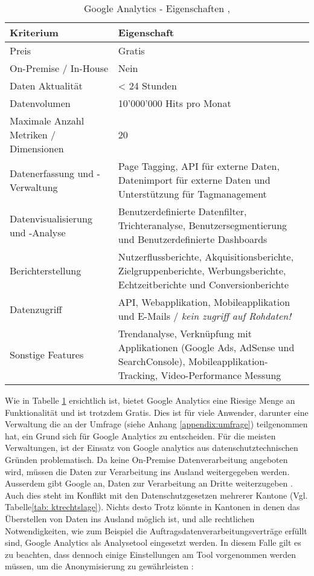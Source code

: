 \begin{table}[h]
	\centering
	\begin{tabular}{ | p{4cm} | p{10cm} |}
		\hline
		\textbf{Kriterium} & \textbf{Eigenschaft}  \\ 
		\hline
		Preis & Gratis \\
    \hline
    On-Premise / In-House & Nein \\
    \hline
    Daten Aktualität & < 24 Stunden \\
    \hline
    Datenvolumen & 10'000'000 Hits pro Monat\\
    \hline
    Maximale Anzahl Metriken / Dimensionen & 20\\
    \hline
    Datenerfassung und -Verwaltung &  Page Tagging, API für externe Daten, Datenimport für externe Daten und Unterstützung für Tagmanagement\\
    \hline
    Datenvisualisierung und -Analyse & Benutzerdefinierte Datenfilter, Trichteranalyse, Benutzersegmentierung und Benutzerdefinierte Dashboards\\
    \hline
    Berichterstellung & Nutzerflussberichte, Akquisitionsberichte, Zielgruppenberichte, Werbungsberichte, Echtzeitberichte und Conversionberichte \\
    \hline
    Datenzugriff & API, Webapplikation, Mobileapplikation und E-Mails / \textit{kein zugriff auf Rohdaten!}\\
    \hline
    Sonstige Features & Trendanalyse, Verknüpfung mit Applikationen (Google Ads, AdSense und SearchConsole), Mobileapplikation-Tracking, Video-Performance Messung\\
		\hline  
	\end{tabular}
	\caption{Google Analytics - Eigenschaften \parencite {GoogleAnalyticsCompare}, \parencite{GoogleAnalyticsFeatures}}
	\label{tab: googleAnalyticsFeatures}
\end{table}

Wie in Tabelle \ref{tab: googleAnalyticsFeatures} ersichtlich ist, bietet Google Analytics eine Riesige Menge an Funktionalität und ist trotzdem Gratis. Dies ist für viele Anwender, darunter eine Verwaltung die an der Umfrage (siehe Anhang \ref{appendix:umfrage}) teilgenommen hat, ein Grund sich für Google Analytics zu entscheiden. Für die meisten Verwaltungen, ist der Einsatz von Google analytics aus datenschutztechnischen Gründen problematisch. Da keine On-Premise Datenverarbeitung angeboten wird, müssen die Daten zur Verarbeitung ins Ausland weitergegeben werden. Ausserdem gibt Google an, Daten zur Verarbeitung an Dritte weiterzugeben \parencite{GoogleInfoSharing}. Auch dies steht im Konflikt mit den Datenschutzgesetzen mehrerer Kantone (Vgl. Tabelle\ref{tab: ktrechtslage}). Nichts desto Trotz könnte in Kantonen in denen das Überstellen von Daten ins Ausland möglich ist, und alle rechtlichen Notwendigkeiten, wie zum Beispiel die Auftragsdatenverarbeitungsverträge erfüllt sind, Google Analytics als Analysetool eingesetzt werden. In diesem Falle gilt es zu beachten, dass dennoch einige Einstellungen am Tool vorgenommen werden müssen, um die Anonymisierung zu gewährleisten \parencite{GoogleAnalyticsDatenschutzEinstellungen}: 

